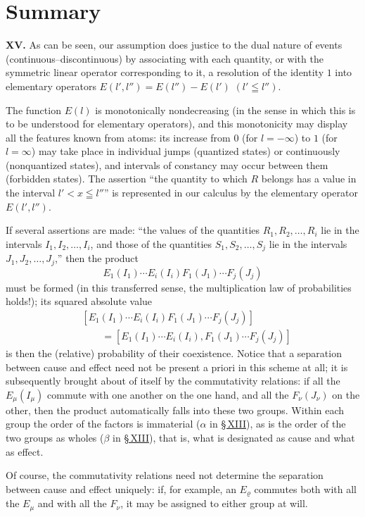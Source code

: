 \documentclass[fontsize=13pt,paper=b5,twoside,bookmarkpackage=false]{scrartcl}
\makeatletter
\newcommand{\majorheading}[2]{%
  \section*{#1}\label{heading:#2}%
  \Hy@writebookmark{}{#1}{\@currentHref}{0}{toc}}
\newcommand{\articleSection}[1]{%
  \par\addvspace{\medskipamount}\phantomsection\label{sec:#1}%
  \pdfbookmark[1]{Section #1}{section-#1}%
  \noindent\textbf{#1.}\enspace\ignorespaces}
\newcommand{\Sec}[1]{\hyperref[sec:#1]{\S\,#1}}
\makeatother
\begin{document}
\majorheading{Summary}{summary}
\articleSection{XV}
As can be seen, our assumption does justice to the dual nature of events (continuous--discontinuous) by associating with each quantity, or with the symmetric linear operator corresponding to it, a resolution of the identity $1$ into elementary operators $E(l',l'')=E(l'')-E(l')$ $(l'\leqq l'')$.

The function $E(l)$ is monotonically nondecreasing (in the sense in which this is to be understood for elementary operators), and this monotonicity may display all the features known from atoms: its increase from $0$ (for $l=-\infty$) to $1$ (for $l=\infty$) may take place in individual jumps (quantized states) or continuously (nonquantized states), and intervals of constancy may occur between them (forbidden states). The assertion ``the quantity to which $R$ belongs has a value in the interval $l'<x\leqq l''$'' is represented in our calculus by the elementary operator $E(l',l'')$.

If several assertions are made: ``the values of the quantities $R_1,R_2,\ldots,R_i$ lie in the intervals $I_1,I_2,\ldots,I_i$, and those of the quantities $S_1,S_2,\ldots,S_j$ lie in the intervals $J_1,J_2,\ldots,J_j$,'' then the product
\[
 E_1(I_1)\cdots E_i(I_i)F_1(J_1)\cdots F_j(J_j)
\]
must be formed (in this transferred sense, the multiplication law of probabilities holds!); its squared absolute value
\begin{align*}
 &[E_1(I_1)\cdots E_i(I_i)F_1(J_1)\cdots F_j(J_j)]\\
 &\qquad=[E_1(I_1)\cdots E_i(I_i),F_1(J_1)\cdots F_j(J_j)]
\end{align*}
is then the (relative) probability of their coexistence. Notice that a separation between cause and effect need not be present a priori in this scheme at all; it is subsequently brought about of itself by the commutativity relations: if all the $E_\mu(I_\mu)$ commute with one another on the one hand, and all the $F_\nu(J_\nu)$ on the other, then the product automatically falls into these two groups. Within each group the order of the factors is immaterial ($\alpha$ in \Sec{XIII}), as is the order of the two groups as wholes ($\beta$ in \Sec{XIII}), that is, what is designated as cause and what as effect.

Of course, the commutativity relations need not determine the separation between cause and effect uniquely: if, for example, an $E_\varrho$ commutes both with all the $E_\mu$ and with all the $F_\nu$, it may be assigned to either group at will.
\end{document}
